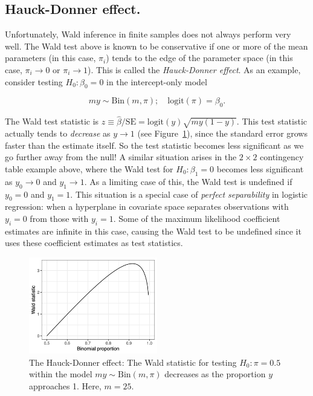 \documentclass[
  11pt,
  letterpaper,
  oneside]{book}
\theoremstyle{plain}
\theoremstyle{plain}
\theoremstyle{definition}
\theoremstyle{definition}
\theoremstyle{plain}
\theoremstyle{remark}
\begin{document}
\hypertarget{sec-hauck-donner-effect}{%
\subsection{Hauck-Donner effect.}\label{sec-hauck-donner-effect}}

Unfortunately, Wald inference in finite samples does not always perform
very well. The Wald test above is known to be conservative if one or
more of the mean parameters (in this case, \(\pi_i\)) tends to the edge
of the parameter space (in this case, \(\pi_i \rightarrow 0\) or
\(\pi_i \rightarrow 1\)). This is called the \emph{Hauck-Donner effect}.
As an example, consider testing \(H_0: \beta_0 = 0\) in the
intercept-only model

\[
my \sim \text{Bin}(m, \pi); \quad \text{logit}(\pi) = \beta_0.
\]

The Wald test statistic is
\(z \equiv \widehat \beta/\text{SE} = \text{logit}(y)\sqrt{my(1-y)}\).
This test statistic actually tends to \emph{decrease} as
\(y \rightarrow 1\) (see Figure~\ref{fig-hauck-donner}), since the
standard error grows faster than the estimate itself. So the test
statistic becomes less significant as we go further away from the null!
A similar situation arises in the \(2 \times 2\) contingency table
example above, where the Wald test for \(H_0: \beta_1 = 0\) becomes less
significant as \(y_0 \rightarrow 0\) and \(y_1 \rightarrow 1\). As a
limiting case of this, the Wald test is undefined if \(y_0 = 0\) and
\(y_1 = 1\). This situation is a special case of \emph{perfect
separability} in logistic regression: when a hyperplane in covariate
space separates observations with \(y_i = 0\) from those with
\(y_i = 1\). Some of the maximum likelihood coefficient estimates are
infinite in this case, causing the Wald test to be undefined since it
uses these coefficient estimates as test statistics.

\begin{figure}

{\centering \includegraphics[width=0.5\textwidth,height=\textheight]{figures/hauck-donner.png}

}

\caption{\label{fig-hauck-donner}The Hauck-Donner effect: The Wald
statistic for testing \(H_0: \pi = 0.5\) within the model
\(my \sim \text{Bin}(m, \pi)\) decreases as the proportion \(y\)
approaches 1. Here, \(m = 25\).}

\end{figure}
\end{document}
